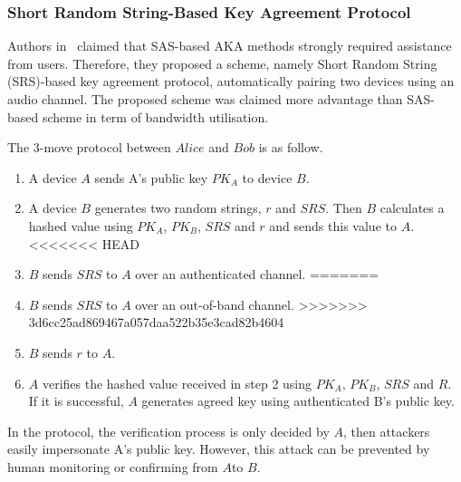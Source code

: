 \begin{center}
\end{center}

\subsubsection{Short Random String-Based Key Agreement Protocol}

Authors in~\cite{5678019} claimed that SAS-based AKA methods strongly required assistance from users. Therefore, they proposed a scheme, namely Short Random String (SRS)-based key agreement protocol, automatically pairing two devices using an audio channel. The proposed scheme was claimed more advantage than SAS-based scheme in term of bandwidth utilisation. 

The 3-move protocol between $Alice$ and $Bob$ is as follow.
\begin{enumerate}
\item A device $A$ sends A's public key $PK_A$ to device $B$.
\item A device $B$ generates two random strings, $r$ and $SRS$. Then $B$ calculates a hashed value using $PK_A$, $PK_B$, $SRS$ and $r$ and sends this value to $A$.
<<<<<<< HEAD
\item $B$ sends $SRS$ to $A$ over an authenticated channel. 
=======
\item $B$ sends $SRS$ to $A$ over an out-of-band channel. 
>>>>>>> 3d6cc25ad869467a057daa522b35e3cad82b4604
\item $B$ sends $r$ to $A$.
\item $A$ verifies the hashed value received in step 2 using $PK_A$, $PK_B$, $SRS$ and $R$. If it is successful, $A$ generates agreed key using authenticated B's public key. 
\end{enumerate}

In the protocol, the verification process is only decided by $A$, then attackers easily impersonate A's public key. However, this attack can be prevented by human monitoring or confirming from $A$to $B$. 

